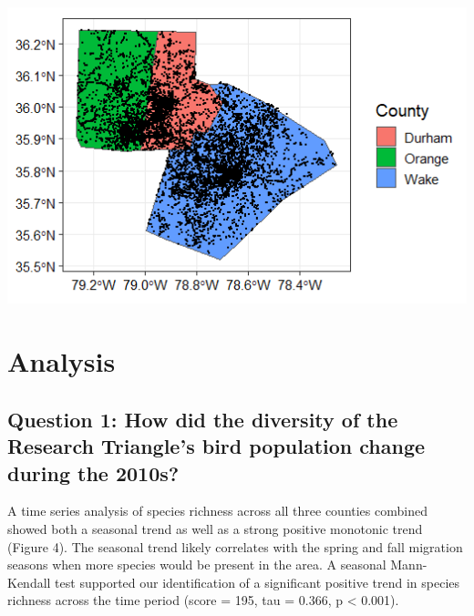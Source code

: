 \documentclass[
  12pt,
]{article}
\begin{document}
\includegraphics{./Output/EDA_geospatial_plot.png} \newpage

\hypertarget{analysis}{%
\section{Analysis}\label{analysis}}

\hypertarget{question-1-how-did-the-diversity-of-the-research-triangles-bird-population-change-during-the-2010s}{%
\subsection{Question 1: How did the diversity of the Research Triangle's
bird population change during the
2010s?}\label{question-1-how-did-the-diversity-of-the-research-triangles-bird-population-change-during-the-2010s}}

A time series analysis of species richness across all three counties
combined showed both a seasonal trend as well as a strong positive
monotonic trend (Figure 4). The seasonal trend likely correlates with
the spring and fall migration seasons when more species would be present
in the area. A seasonal Mann-Kendall test supported our identification
of a significant positive trend in species richness across the time
period (score = 195, tau = 0.366, p \textless{} 0.001).
\end{document}
